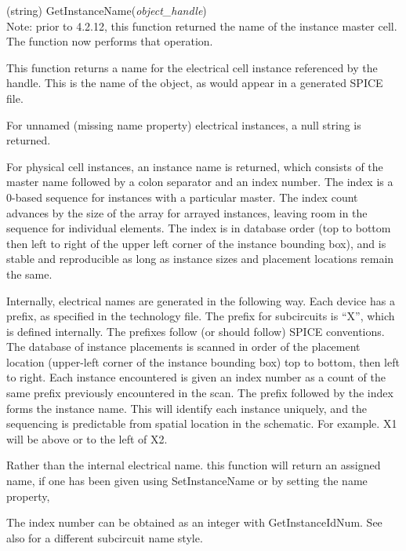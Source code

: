 \begin{description}
\item{(string) \vt GetInstanceName({\it object\_handle\/})}\\
Note:  prior to 4.2.12, this function returned the name of the
instance master cell.  The  function now
performs that operation.

This function returns a name for the electrical cell instance
referenced by the handle.  This is the name of the object, as would
appear in a generated SPICE file.

For unnamed (missing name property) electrical instances, a null
string is returned.
  
For physical cell instances, an instance name is returned, which
consists of the master name followed by a colon separator and an index
number.  The index is a 0-based sequence for instances with a
particular master.  The index count advances by the size of the array
for arrayed instances, leaving room in the sequence for individual
elements.  The index is in database order (top to bottom then left to
right of the upper left corner of the instance bounding box), and is
stable and reproducible as long as instance sizes and placement
locations remain the same.

Internally, electrical names are generated in the following way.  Each
device has a prefix, as specified in the technology file.  The prefix
for subcircuits is ``X'', which is defined internally.  The prefixes
follow (or should follow) SPICE conventions.  The database of instance
placements is scanned in order of the placement location (upper-left
corner of the instance bounding box) top to bottom, then left to
right.  Each instance encountered is given an index number as a count
of the same prefix previously encountered in the scan.  The prefix
followed by the index forms the instance name.  This will identify
each instance uniquely, and the sequencing is predictable from spatial
location in the schematic.  For example.  {\vt X1} will be above or to
the left of {\vt X2}.

Rather than the internal electrical name.  this function will return
an assigned name, if one has been given using {\vt SetInstanceName} or
by setting the name property,

The index number can be obtained as an integer with {\vt
GetInstanceIdNum}.  See also  for a
different subcircuit name style.


\end{description}
